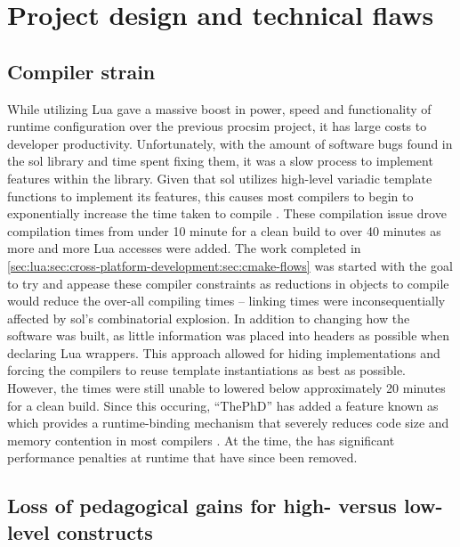 \section{Project design and technical flaws}

\subsection{Compiler strain}

While utilizing Lua gave a massive boost in power, speed and functionality of runtime configuration over the previous procsim project, it has large costs to developer productivity. Unfortunately, with the amount of software bugs found in the sol library and time spent fixing them, it was a slow process to implement features within the library. Given that sol utilizes high-level variadic template functions to implement its features, this causes most compilers to begin to exponentially increase the time taken to compile \cite{Github:ThePhD:sol2:issue:126, Github:ThePhD:sol2:issue:295, Github:ThePhD:sol2:compilation}. These compilation issue drove compilation times from under 10 minute for a clean build to over 40 minutes as more and more Lua accesses were added. The work completed in \cref{sec:lua:sec:cross-platform-development:sec:cmake-flows} was started with the goal to try and appease these compiler constraints as reductions in objects to compile would reduce the over-all compiling times -- linking times were inconsequentially affected by sol's combinatorial explosion. In addition to changing how the software was built, as little information was placed into headers as possible when declaring Lua wrappers. This approach allowed for hiding implementations and forcing the compilers to reuse template instantiations as best as possible. However, the times were still unable to lowered below approximately 20 minutes for a clean build. Since this occuring, ``ThePhD'' has added a feature known as  which provides a runtime-binding mechanism that severely reduces code size and memory contention in most compilers \cite{Github:ThePhD:sol2:simple-usertype}. At the time, the  has significant performance penalties at runtime that have since been removed. 

\subsection{Loss of pedagogical gains for high- versus low-level constructs}

